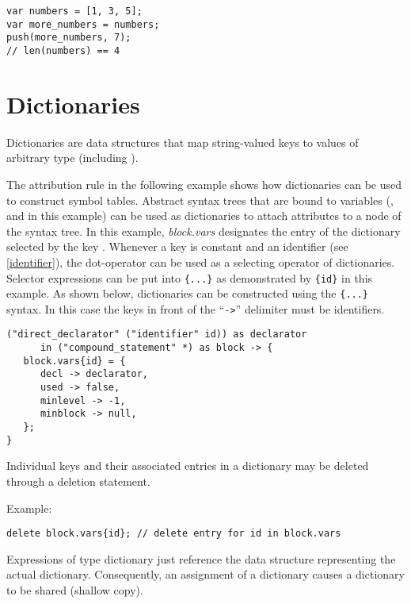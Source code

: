 \begin{lstlisting}
var numbers = [1, 3, 5];
var more_numbers = numbers;
push(more_numbers, 7);
// len(numbers) == 4
\end{lstlisting}

\section{Dictionaries}\label{dictionary}

Dictionaries are data structures that map string-valued keys
to values of arbitrary type (including ).

The attribution rule in the following example shows how dictionaries
can be used to construct symbol tables. Abstract syntax trees that are
bound to variables (,  and  in
this example) can be used as dictionaries to attach attributes to a node
of the syntax tree. In this example, \textit{block.vars} designates the
entry of the dictionary  selected by the key .
Whenever a key is constant and an identifier (see \ref{identifier}),
the dot-operator can be used as a selecting operator of dictionaries.
Selector expressions can be put into \lstinline!{...}! as demonstrated
by \lstinline!{id}! in this example. As shown below, dictionaries can be
constructed using the \lstinline!{...}! syntax. In this case the keys in
front of the ``\lstinline!->!'' delimiter must be identifiers.

\begin{lstlisting}
("direct_declarator" ("identifier" id)) as declarator
      in ("compound_statement" *) as block -> {
   block.vars{id} = {
      decl -> declarator,
      used -> false,
      minlevel -> -1,
      minblock -> null,
   };
}
\end{lstlisting}

\noindent
Individual keys and their associated entries in a dictionary
may be deleted through a deletion statement.

\bigskip
\noindent
Example:

\begin{lstlisting}
delete block.vars{id}; // delete entry for id in block.vars
\end{lstlisting}

\noindent
Expressions of type dictionary just reference the data structure
representing the actual dictionary. Consequently, an assignment of a
dictionary causes a dictionary to be shared
(shallow copy).

